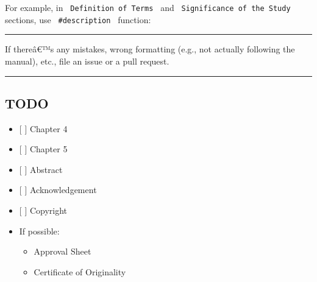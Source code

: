 For example, in \texttt{\ Definition\ of\ Terms\ } and
\texttt{\ Significance\ of\ the\ Study\ } sections, use
\texttt{\ \#description\ } function:

\begin{Shaded}
\begin{Highlighting}[]
\NormalTok{  (}
\NormalTok{  )}
\NormalTok{)}


\NormalTok{  (}
\NormalTok{  )}
\NormalTok{)}
\end{Highlighting}
\end{Shaded}

\begin{center}\rule{0.5\linewidth}{0.5pt}\end{center}

If thereâ€™s any mistakes, wrong formatting (e.g., not actually
following the manual), etc., file an issue or a pull request.

\begin{center}\rule{0.5\linewidth}{0.5pt}\end{center}

\subsection{TODO}\label{todo}

\begin{itemize}
\tightlist
\item
  {[} {]} Chapter 4
\item
  {[} {]} Chapter 5
\item
  {[} {]} Abstract
\item
  {[} {]} Acknowledgement
\item
  {[} {]} Copyright
\item
  If possible:

  \begin{itemize}
  \tightlist
  \item
    Approval Sheet
  \item
    Certificate of Originality
  \end{itemize}
\end{itemize}

